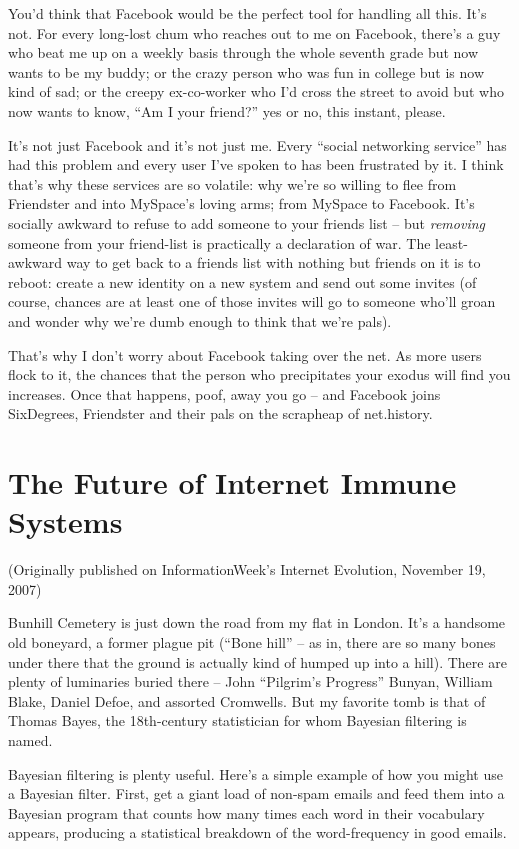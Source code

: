 You'd think that Facebook would be the perfect tool for handling
all this. It's not. For every long-lost chum who reaches out to me
on Facebook, there's a guy who beat me up on a weekly basis through
the whole seventh grade but now wants to be my buddy; or the crazy
person who was fun in college but is now kind of sad; or the creepy
ex-co-worker who I'd cross the street to avoid but who now wants to
know, ``Am I your friend?'' yes or no, this instant, please.

It's not just Facebook and it's not just me. Every ``social
networking service'' has had this problem and every user I've spoken
to has been frustrated by it. I think that's why these services are
so volatile: why we're so willing to flee from Friendster and into
MySpace's loving arms; from MySpace to Facebook. It's socially
awkward to refuse to add someone to your friends list -- but
\emph{removing} someone from your friend-list is practically a
declaration of war. The least-awkward way to get back to a friends
list with nothing but friends on it is to reboot: create a new
identity on a new system and send out some invites (of course,
chances are at least one of those invites will go to someone who'll
groan and wonder why we're dumb enough to think that we're pals).

That's why I don't worry about Facebook taking over the net. As
more users flock to it, the chances that the person who
precipitates your exodus will find you increases. Once that
happens, poof, away you go -- and Facebook joins SixDegrees,
Friendster and their pals on the scrapheap of net.history.

\section{The Future of Internet Immune Systems}

(Originally published on InformationWeek's Internet Evolution,
November 19, 2007)

Bunhill Cemetery is just down the road from my flat in London. It’s
a handsome old boneyard, a former plague pit (“Bone hill” -- as in,
there are so many bones under there that the ground is actually
kind of humped up into a hill). There are plenty of luminaries
buried there -- John “Pilgrim’s Progress” Bunyan, William Blake,
Daniel Defoe, and assorted Cromwells. But my favorite tomb is that
of Thomas Bayes, the 18th-century statistician for whom Bayesian
filtering is named.

Bayesian filtering is plenty useful. Here’s a simple example of how
you might use a Bayesian filter. First, get a giant load of
non-spam emails and feed them into a Bayesian program that counts
how many times each word in their vocabulary appears, producing a
statistical breakdown of the word-frequency in good emails.

